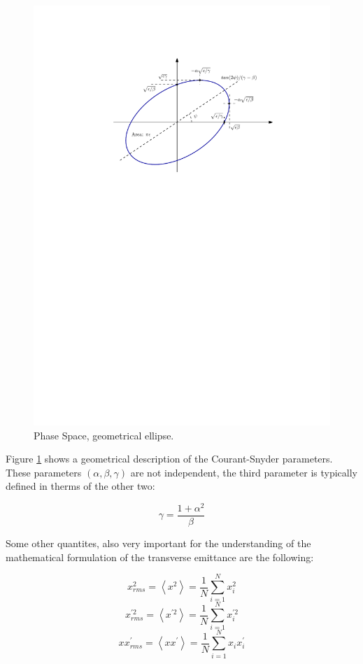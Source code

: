 \begin{figure}[h]
    \centering
    \includegraphics[width=0.7\columnwidth]{Figure_GeometricEmittance/GeometricEmittancve.pdf}
    \caption{Phase Space, geometrical ellipse. }
    \label{fig:CouranSnyder}
\end{figure}

    
Figure \ref{fig:CouranSnyder} shows a geometrical description of the Courant-Snyder parameters. These parameters $\left(\alpha , \beta , \gamma \right)$ are not independent, the third parameter is typically defined in therms of the other two: 

\begin{equation}
    \gamma = \frac{1 + \alpha^{2}}{\beta}
\end{equation}

Some other quantites, also very important for the understanding of the mathematical formulation of the transverse emittance are the following: 

\begin{equation}
    x_{rms}^2 = \left<x^2\right> =\frac{1}{N}\sum_{i=1}^N x_i^2
\end{equation}
\begin{equation}
    x_{rms}^{'2} = \left<x^{'2}\right> = \frac{1}{N}\sum_{i=1}^N x_i^{'2}
\end{equation}
\begin{equation}
    x x^{'}_{rms} =  \left< x x^{'}\right> = \frac{1}{N}\sum_{i = 1}^{N} x_{i} x^{'}_{i}
\end{equation}

